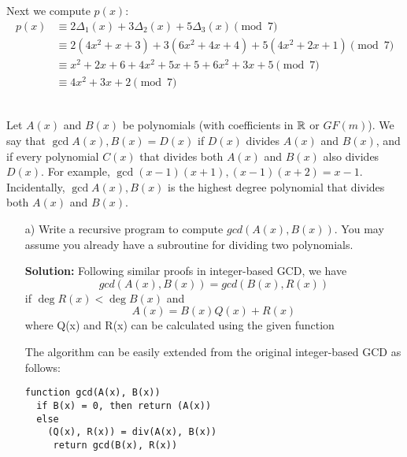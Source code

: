 \documentclass[]{article}
\newif\ifsolutions
\renewcommand{\answer}[1]{{\color{mydarkblue}\textbf{Solution:}#1}}
\begin{document}
\begin{qunlist}
\begin{itemize}
{{Next we compute $p(x)$:
\begin{align*}
p(x) &\equiv 2 \Delta_1(x) + 3 \Delta_2(x) + 5 \Delta_3(x)  \pmod 7\\
&\equiv 2(4x^2+x+3)+3(6x^2+4x+4)+5(4x^2+2x+1)\pmod 7\\
&\equiv x^2+2x+6+4x^2+5x+5+6x^2+3x+5 \pmod 7\\
&\equiv 4x^2+3x+2 \pmod 7
\end{align*}


}}\fi

\end{itemize}



\newpage


 \\   %
Let $A(x)$ and $B(x)$ be polynomials (with coefficients in $\mathbb{R}$ or $GF(m)$). We say that  $\gcd{A(x), B(x)} = D(x)$ if $D(x)$ divides $A(x)$ and $B(x)$, and if every polynomial $C(x)$ that divides both $A(x)$ and $B(x)$ also divides $D(x)$. For example, $\gcd{(x-1)(x+1), (x-1)(x+2)} = x-1$. Incidentally, $\gcd{A(x), B(x)}$ is the highest degree polynomial that divides both $A(x)$ and $B(x)$.

\begin{itemize}
\qpart
\item[a)] Write a recursive program to compute $gcd(A(x),B(x))$. 
You may assume you already have a subroutine for dividing two polynomials. 


\answer{
Following similar proofs in integer-based GCD, we have
\[ gcd(A(x), B(x)) = gcd(B(x), R(x)) \]
if $\deg{R(x)} < \deg{B(x)}$ and
\[ A(x) = B(x)Q(x) + R(x) \]
where Q(x) and R(x) can be calculated using the given function

The algorithm can be easily extended from the original integer-based GCD as follows: 
}
\begin{verbatim}
function gcd(A(x), B(x))
  if B(x) = 0, then return (A(x))
  else
    (Q(x), R(x)) = div(A(x), B(x))
     return gcd(B(x), R(x))
\end{verbatim}



\end{itemize}
\end{qunlist}
\end{document}
